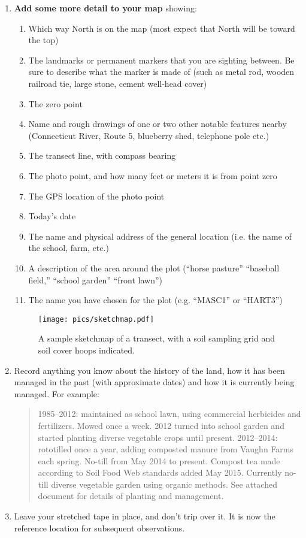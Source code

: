 \documentclass[11pt,letterpaper,twoside,onecolumn]{memoir}
\begin{document}
\begin{enumerate}
\item \textbf{Add some more detail to your map} showing:
\begin{enumerate}
\item Which way North is on the map (most expect that North will be toward the top)
\item The landmarks or permanent markers that you are sighting between. Be sure to describe what the marker is made of (such as metal rod, wooden railroad tie, large stone, cement well-head cover)
\item The zero point
\item Name and rough drawings of one or two other notable features nearby (Connecticut River, Route 5, blueberry shed, telephone pole etc.)
\item The transect line, with compass bearing
\item The photo point, and how many feet or meters it is from point zero
\item The GPS location of the photo point
\item Today's date
\item The name and physical address of the general location (i.e. the name of the school, farm, etc.)
\item A description of the area around the plot (``horse pasture'' ``baseball field,'' ``school garden'' ``front lawn'')
\item The name you have chosen for the plot (e.g. ``MASC1''  or ``HART3'')
\end{enumerate}

\begin{figure}
\texttt{[image: pics/sketchmap.pdf]}
\caption*{A sample sketchmap of a transect, with a soil sampling grid and soil cover hoops indicated.}\end{figure}

\item {Record anything you know about the history of the land, how it has been managed in the past (with approximate dates) and how it is currently being managed. For example: 

\begin{quotation}\noindent \small 1985--2012: maintained as school lawn, using commercial herbicides and fertilizers.  Mowed once a week. 2012 turned into school garden and started planting diverse vegetable crops until present. 2012--2014: rototilled once a year, adding composted manure from Vaughn Farms each spring. No-till from May 2014 to present. Compost tea made according to Soil Food Web standards added May 2015. Currently no-till diverse vegetable garden using organic methods. See attached document for details of planting and management.\end{quotation}
}
\item Leave your stretched tape in place, and don't trip over it. It is now the reference location for subsequent observations.


\end{enumerate}
\end{document}
